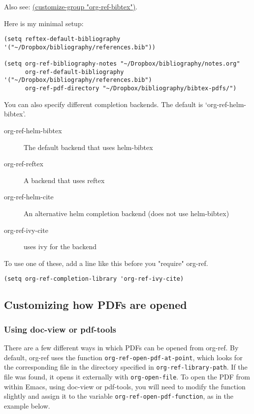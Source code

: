 \documentclass[11pt]{article}
\begin{document}
Also see:  \url{(customize-group "org-ref-bibtex")}.

Here is my minimal setup:
\begin{verbatim}
(setq reftex-default-bibliography '("~/Dropbox/bibliography/references.bib"))

(setq org-ref-bibliography-notes "~/Dropbox/bibliography/notes.org"
      org-ref-default-bibliography '("~/Dropbox/bibliography/references.bib")
      org-ref-pdf-directory "~/Dropbox/bibliography/bibtex-pdfs/")
\end{verbatim}

You can also specify different completion backends. The default is `org-ref-helm-bibtex'.

\begin{description}
\item[{org-ref-helm-bibtex}] The default backend that uses helm-bibtex
\item[{org-ref-reftex}] A backend that uses reftex
\item[{org-ref-helm-cite}] An alternative helm completion backend (does not use helm-bibtex)
\item[{org-ref-ivy-cite}] uses ivy for the backend
\end{description}

To use one of these, add a line like this before you "require" org-ref.

\begin{verbatim}
(setq org-ref-completion-library 'org-ref-ivy-cite)
\end{verbatim}

\subsection{Customizing how PDFs are opened}
\label{sec:org24b2b6b}
\subsubsection{Using doc-view or pdf-tools}
\label{sec:org3badca8}

There are a few different ways in which PDFs can be opened from org-ref. By default, org-ref uses the function \texttt{org-ref-open-pdf-at-point}, which looks for the corresponding file in the directory specified in \texttt{org-ref-library-path}. If the file was found, it opens it externally with \texttt{org-open-file}. To open the PDF from within Emacs, using doc-view or pdf-tools, you will need to modify the function slightly and assign it to the variable \texttt{org-ref-open-pdf-function}, as in the example below.
\end{document}
